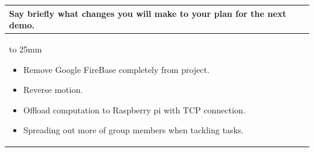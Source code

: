 \documentclass[a4paper]{article}
\newcommand{\colWidth}{141mm}
\begin{document}
\begin{center}
\begin{tabular}{|p{\colWidth}|}
	\hline
	\cellcolor{blue!25}\large
	\textbf{Say briefly what changes you will make to your plan for the next demo.}
	\\ \hline
	\vtop to 25mm{
	\begin{itemize}
	    \item Remove Google FireBase completely from project.
	    \item Reverse motion.
	    \item Offload computation to Raspberry pi with TCP connection.
	    \item Spreading out more of group members when tackling tasks.
	\end{itemize}
  }
  \\
  \hline
\end{tabular}

\end{center}
  
\end{document}
